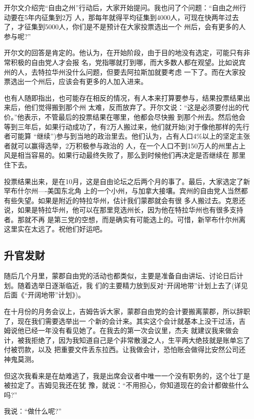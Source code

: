 ﻿\documentclass[11pt]{article}
\begin{document}
开尔文介绍完``自由之州''行动后，大家开始提问。我也问了个问题：``自由之州行动要在5年内征集到2万
人，那每年就得平均征集到4000人，可现在快两年过去了，才征集到5000人，你们是不是预计在大家投票选出一个
州后，会有更多的人参与呢?''

开尔文的回答是肯定的。他认为，在开始阶段，由于目的地没有选定，可能只有非常积极的自由党人才会报
名，党指哪就打到哪，而大多数人都在观望。比如说宾州的人，去特拉华州没什么问题，但要去阿拉斯加就要考虑
一下了。而在大家投票选出一个州后，应该会有更多的人加入进来。

也有人随即指出，也可能存在相反的情况，有人本来打算要参与，结果投票结果出来后，他们觉得搬到那个州
太难，反而放弃了。开尔文说：``这是必须要付出的代价。''他表示，不管最后的投票结果在哪里，他都会尽快搬
到那个州去。然后他会等到三年后，如果行动成功了，有2万人搬过来，他们就开始(对于像他那样的先行者可能算
``继续'')参与到当地的政治里去。他们认为，占有人口4\%以上的坚定主张者就可以赢得选举，2万积极参与政治的
人，在一个人口不到150万人的州里占上风是相当容易的。如果行动最终失败了，那么到时候他们再决定是否继续在
那里住下去。

投票结果出来，是在10月，这是自由论坛之后两个月的事了。最后，大家选定了新罕布什尔州----美国东北角
上的一个小州，与加拿大接壤。宾州的自由党人当然都有些失望。如果是附近的特拉华州，估计我们蒙郡就会有很
多人搬过去。克恩还说，如果是特拉华州，他可以在那里竞选州长，因为他在特拉华州也有很多支持者。那就不再
是第三党的空想，而是确实有可能选上的。可惜，新罕布什尔州离这里实在太远了。祝他们好运吧。

\subsection{升官发财}

随后几个月里，蒙郡自由党的活动也都类似，主要是准备自由讲坛、讨论日后计划。随着选举日逐渐临近，我
们的主要精力放到反对``开阔地带''计划上去了(详见后面《``开阔地带''计划》)。

在十月份的月务会议上，吉姆告诉大家，蒙郡自由党的会计要搬离蒙郡，所以辞职了，现在我们需要选举出一
个新的会计来。其实这个会计就基本上没干过活，吉姆说他已经一年没有看见她了。在我去的第一次会议里，杰夫
就建议我来做会计，被我拒绝了，因为我知道自己是个非常散漫之人，生平两大绝技就是账单忘了付被罚款，以及
把重要文件丢东拉西。让我做会计，恐怕账会做得比安然公司还神鬼莫测。

但这次我看来是在劫难逃了，我是出席会议者中唯一一个没有职务的，这个壮丁是被拉定了。吉姆见我还在犹
豫，就说：``不用担心，你知道现在的会计都做些什么吗?''

我说：``做什么呢?''
\end{document}
